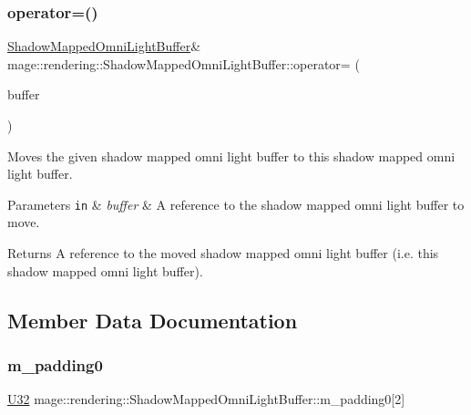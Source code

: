 \subsubsection{\texorpdfstring{operator=()}{operator=()}\hspace{0.1cm}{\footnotesize\ttfamily [2/2]}}
{\footnotesize\ttfamily \mbox{\hyperlink{structmage_1_1rendering_1_1_shadow_mapped_omni_light_buffer}{Shadow\+Mapped\+Omni\+Light\+Buffer}}\& mage\+::rendering\+::\+Shadow\+Mapped\+Omni\+Light\+Buffer\+::operator= (\begin{DoxyParamCaption}\item[{\mbox{\hyperlink{structmage_1_1rendering_1_1_shadow_mapped_omni_light_buffer}{Shadow\+Mapped\+Omni\+Light\+Buffer}} \&\&}]{buffer }\end{DoxyParamCaption})\hspace{0.3cm}{\ttfamily [default]}}

Moves the given shadow mapped omni light buffer to this shadow mapped omni light buffer.


\begin{DoxyParams}[1]{Parameters}
\mbox{\tt in}  & {\em buffer} & A reference to the shadow mapped omni light buffer to move. \\
\hline
\end{DoxyParams}
\begin{DoxyReturn}{Returns}
A reference to the moved shadow mapped omni light buffer (i.\+e. this shadow mapped omni light buffer). 
\end{DoxyReturn}


\subsection{Member Data Documentation}
\mbox{\label{structmage_1_1rendering_1_1_shadow_mapped_omni_light_buffer_a01a76a39534ba04a2b1fe77ae5d1522c}} 
\subsubsection{\texorpdfstring{m\+\_\+padding0}{m\_padding0}}
{\footnotesize\ttfamily \mbox{\hyperlink{namespacemage_a41c104c036fba3756a74e19f793eeaa1}{U32}} mage\+::rendering\+::\+Shadow\+Mapped\+Omni\+Light\+Buffer\+::m\+\_\+padding0\mbox{[}2\mbox{]}}

